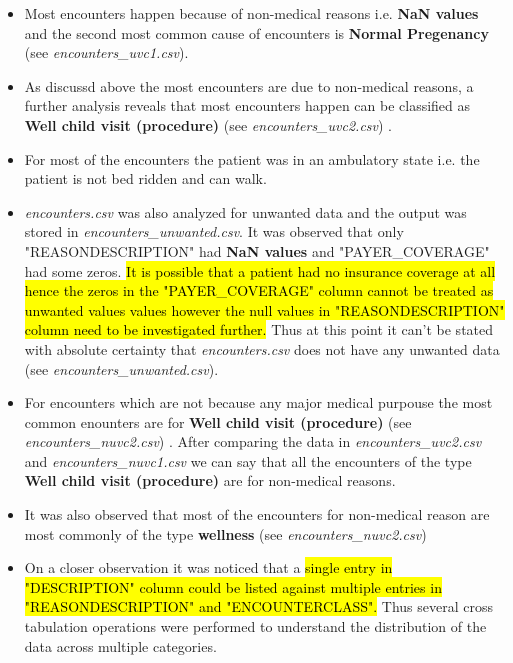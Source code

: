 \documentclass[12pt, twosided]{report}  %
\begin{document}
\begin{itemize}
	\item Most encounters happen because of non-medical reasons i.e. \textbf{NaN values} and the second most common cause of encounters is \textbf{Normal Pregenancy} (see \textit{encounters\_uvc1.csv}).
	
	\item As discussd above the most encounters are due to non-medical reasons, a further analysis reveals that most encounters happen can be classified as \textbf{Well child visit (procedure)} (see \textit{encounters\_uvc2.csv}) .
	
	\item For most of the encounters the patient was in an ambulatory state i.e. the patient is not bed ridden and can walk.
	
	
	\item \textit{encounters.csv} was also analyzed for unwanted data and the output was stored in \textit{encounters\_unwanted.csv}. It was observed that only "REASONDESCRIPTION" had \textbf{NaN values} and "PAYER\_COVERAGE" had some zeros. \hl{It is possible that a patient had no insurance coverage at all hence the zeros in the "PAYER\_COVERAGE" column cannot be treated as unwanted values values however the null values in "REASONDESCRIPTION"  column need to be investigated further.} Thus at this point it can't be stated with absolute certainty that \textit{encounters.csv} does not have any unwanted data (see \textit{encounters\_unwanted.csv}). 
	
	\item For encounters which are not because any major medical purpouse the most common enounters are for  \textbf{Well child visit (procedure)} (see \textit{encounters\_nuvc2.csv}) . After comparing the data in \textit{encounters\_uvc2.csv} and \textit{encounters\_nuvc1.csv} we can say that all the encounters of the type \textbf{Well child visit (procedure)} are for non-medical reasons.
	
	\item It was also observed that most of the encounters for non-medical reason are most commonly of the type \textbf{wellness} (see \textit{encounters\_nuvc2.csv})
	
	\item On a closer observation it was noticed that a \hl{single entry in "DESCRIPTION" column could be listed against multiple entries in "REASONDESCRIPTION" and "ENCOUNTERCLASS".} Thus several cross tabulation operations were performed to understand the distribution of the data across multiple categories.
	

\end{itemize}
\end{document}
